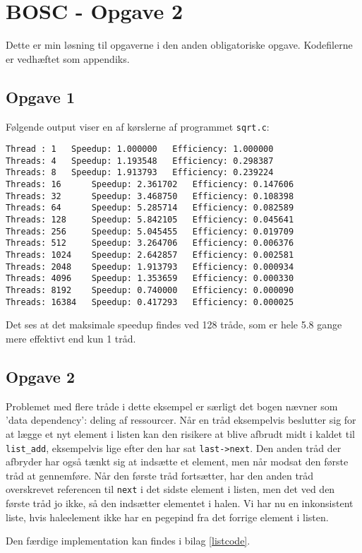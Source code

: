 \documentclass{article}
\begin{document}
\section*{BOSC - Opgave 2}
Dette er min løsning til opgaverne i den anden obligatoriske opgave. Kodefilerne er vedhæftet som appendiks. 

\subsection*{Opgave 1}
Følgende output viser en af kørslerne af programmet \texttt{sqrt.c}:
\begin{verbatim}
Thread : 1 	 Speedup: 1.000000 	 Efficiency: 1.000000
Threads: 4 	 Speedup: 1.193548 	 Efficiency: 0.298387
Threads: 8 	 Speedup: 1.913793 	 Efficiency: 0.239224
Threads: 16 	 Speedup: 2.361702 	 Efficiency: 0.147606
Threads: 32 	 Speedup: 3.468750 	 Efficiency: 0.108398
Threads: 64 	 Speedup: 5.285714 	 Efficiency: 0.082589
Threads: 128 	 Speedup: 5.842105 	 Efficiency: 0.045641
Threads: 256 	 Speedup: 5.045455 	 Efficiency: 0.019709
Threads: 512 	 Speedup: 3.264706 	 Efficiency: 0.006376
Threads: 1024 	 Speedup: 2.642857 	 Efficiency: 0.002581
Threads: 2048 	 Speedup: 1.913793 	 Efficiency: 0.000934
Threads: 4096 	 Speedup: 1.353659 	 Efficiency: 0.000330
Threads: 8192 	 Speedup: 0.740000 	 Efficiency: 0.000090
Threads: 16384 	 Speedup: 0.417293 	 Efficiency: 0.000025
\end{verbatim}
Det ses at det maksimale speedup findes ved 128 tråde, som er hele 5.8 gange mere effektivt end kun 1 tråd. 

\subsection*{Opgave 2}
Problemet med flere tråde i dette eksempel er særligt det bogen nævner som 'data dependency': deling af ressourcer. Når en tråd eksempelvis beslutter sig for at lægge et nyt element i listen kan den risikere at blive afbrudt midt i kaldet til \texttt{list\_add}, eksempelvis lige efter den har sat \texttt{last->next}. Den anden tråd der afbryder har også tænkt sig at indsætte et element, men når modsat den første tråd at gennemføre. Når den første tråd fortsætter, har den anden tråd overskrevet referencen til \texttt{next} i det sidste element i listen, men det ved den første tråd jo ikke, så den indsætter elementet i halen. Vi har nu en inkonsistent liste, hvis haleelement ikke har en pegepind fra det forrige element i listen.

Den færdige implementation kan findes i bilag \ref{listcode}.
\end{document}
